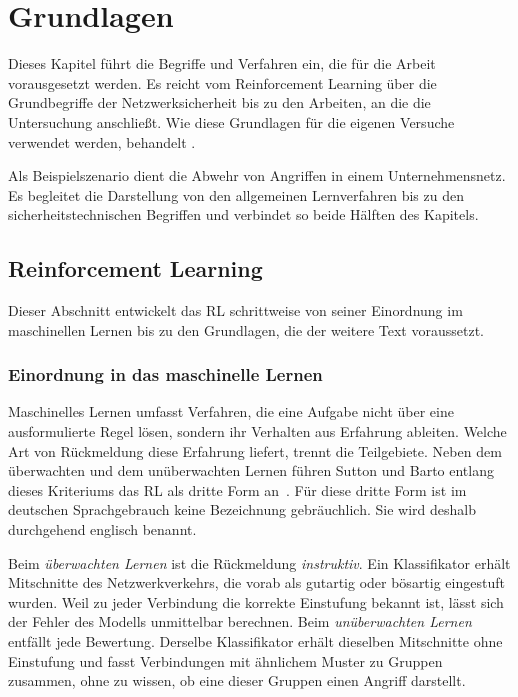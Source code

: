\chapter{Grundlagen}
\label{ch:grundlagen}

Dieses Kapitel führt die Begriffe und Verfahren ein, die für die Arbeit
vorausgesetzt werden. Es reicht vom Reinforcement Learning über die
Grundbegriffe der Netzwerksicherheit bis zu den Arbeiten, an die die
Untersuchung anschließt. Wie diese Grundlagen für die
eigenen Versuche verwendet werden, behandelt .

Als Beispielszenario dient die Abwehr von Angriffen in einem
Unternehmensnetz. Es begleitet die Darstellung von den allgemeinen
Lernverfahren bis zu den sicherheitstechnischen Begriffen und verbindet so
beide Hälften des Kapitels.

\section{Reinforcement Learning}
\label{sec:rl}

Dieser Abschnitt entwickelt das \ac{RL} schrittweise von seiner Einordnung im
maschinellen Lernen bis zu den Grundlagen, die der weitere Text voraussetzt.

\subsection{Einordnung in das maschinelle Lernen}

Maschinelles Lernen umfasst Verfahren, die eine Aufgabe nicht über eine
ausformulierte Regel lösen, sondern ihr Verhalten aus Erfahrung ableiten. Welche
Art von Rückmeldung diese Erfahrung liefert, trennt die Teilgebiete. Neben dem
überwachten und dem unüberwachten Lernen führen Sutton und Barto entlang dieses
Kriteriums das \ac{RL} als dritte Form
an~\cite[Abschn.~1.1]{suttonbarto2018}. Für diese dritte Form ist im deutschen Sprachgebrauch keine Bezeichnung
gebräuchlich. Sie wird deshalb durchgehend
englisch benannt.

Beim \emph{überwachten Lernen} ist die Rückmeldung \emph{instruktiv}. Ein
Klassifikator erhält Mitschnitte des Netzwerkverkehrs, die vorab als gutartig
oder bösartig eingestuft wurden. Weil zu jeder Verbindung die korrekte
Einstufung bekannt ist, lässt sich der Fehler des Modells unmittelbar berechnen.
Beim \emph{unüberwachten Lernen} entfällt jede Bewertung. Derselbe Klassifikator
erhält dieselben Mitschnitte ohne Einstufung und fasst Verbindungen mit
ähnlichem Muster zu Gruppen zusammen, ohne zu wissen, ob eine dieser Gruppen
einen Angriff darstellt.

